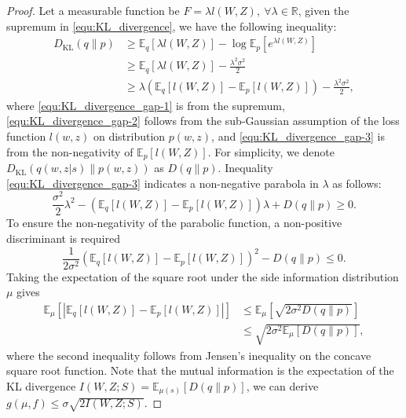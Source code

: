 \documentclass[lettersize,journal]{IEEEtran}
\newcommand{\R}{\mathbb{R}}
\newcommand{\E}{\mathbb{E}}
\theoremstyle{definition}
\theoremstyle{plain}
\begin{document}
\begin{proof}
    Let a measurable function be $F=\lambda l(W,Z),\ \forall \lambda\in\R$, given the supremum in \cref{equ:KL_divergence}, we have the following inequality:
    \begin{subequations}
        \label{equ:KL_divergence_gap}
        \begin{align}
            D_{\text{KL}}(q\| p) & \geq \E_{q}\left[\lambda l(W,Z)\right] - \log \E_{p}\left[e^{\lambda l(W,Z)}\right] \label{equ:KL_divergence_gap-1} \\
            & \geq \E_{q}\left[\lambda l(W,Z)\right] - \frac{\lambda^2\sigma^2}{2} \label{equ:KL_divergence_gap-2} \\
            & \geq  \lambda\left(\E_{q}\left[ l(W,Z)\right]- \E_{p}\left[ l(W,Z)\right]\right) - \frac{\lambda^2\sigma^2}{2}, \label{equ:KL_divergence_gap-3}
        \end{align}
    \end{subequations}
    where \cref{equ:KL_divergence_gap-1} is from the supremum, \cref{equ:KL_divergence_gap-2} follows from the sub-Gaussian assumption of the loss function $l(w,z)$ on distribution $p(w,z)$, and \cref{equ:KL_divergence_gap-3} is from the non-negativity of $\E_{p}\left[ l(W,Z)\right]$.
    For simplicity, we denote $D_{\text{KL}}(q(w, z | s)\| p(w,z))$ as $D(q\|p)$. 
    Inequality \cref{equ:KL_divergence_gap-3} indicates a non-negative parabola in $\lambda$ as follows:
    \begin{equation}
        \label{equ:parabola}
        \frac{\sigma^2}{2}\lambda^2 - \left(\E_{q}\left[ l(W,Z)\right] - \E_{p}\left[ l(W,Z)\right]\right)\lambda + D(q\|p) \geq 0.
    \end{equation}
    To ensure the non-negativity of the parabolic function, a non-positive discriminant is required
    \begin{equation}
        \label{equ:KL_divergence_discriminant}
        \frac{1}{2 \sigma^2}\left(\E_q[l(W, Z)]-\E_p[l(W, Z)]\right)^2 - D(q\|p) \leq 0.
    \end{equation}
    Taking the expectation of the square root under the side information distribution $\mu$ gives
    \begin{equation}
        \label{equ:jensen_inequality}
        \begin{split}
            \E_{\mu}\left[\left|\E_q[l(W,Z)]-\E_p[l(W,Z)]\right|\right] & \leq \E_{\mu}\left[\sqrt{2 \sigma^2 D(q\|p)}\right] \\
            & \leq \sqrt{2 \sigma^2 \E_{\mu}\left[D(q\|p)\right]},
        \end{split}
    \end{equation}
    where the second inequality follows from Jensen's inequality on the concave square root function. Note that the mutual information is the expectation of the KL divergence $I(W,Z;S) = \E_{\mu(s)}\left[ D(q\|p)\right]$, we can derive $g(\mu,f) \leq \sigma \sqrt{2I(W,Z;S)}$. 
\end{proof}
\end{document}
